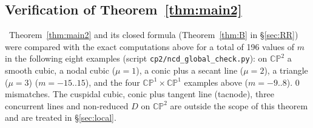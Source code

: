 \subsection{Verification of Theorem~\ref{thm:main2}}
\tV\ Theorem~\ref{thm:main2} and its closed formula (Theorem~\ref{thm:B} in \S\ref{sec:RR}) were compared with the exact computations above for a total of 196 values of $m$ in the following eight examples (script \texttt{cp2/ncd\_global\_check.py}): on $\mathbb{CP}^2$ a smooth cubic, a nodal cubic ($\mu=1$), a conic plus a secant line ($\mu=2$), a triangle ($\mu=3$) ($m=-15..15$), and the four $\mathbb{CP}^1\times\mathbb{CP}^1$ examples above ($m=-9..8$). 0 mismatches. The cuspidal cubic, conic plus tangent line (tacnode), three concurrent lines and non-reduced $D$ on $\mathbb{CP}^2$ are outside the scope of this theorem and are treated in \S\ref{sec:local}.


